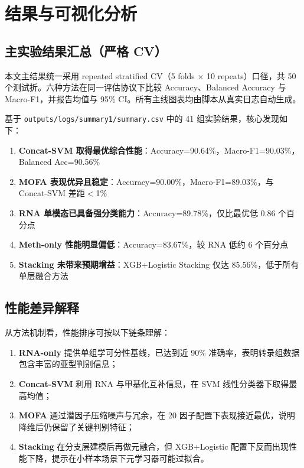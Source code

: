 \section{结果与可视化分析}

\subsection{主实验结果汇总（严格 CV）}

本文主结果统一采用 repeated stratified CV（5 folds $\times$ 10 repeats）口径，共 50 个测试折。六种方法在同一评估协议下比较 Accuracy、Balanced Accuracy 与 Macro-F1，并报告均值与 95\% CI。所有主线图表均由脚本从真实日志自动生成。

基于 \texttt{outputs/logs/summary1/summary.csv} 中的 41 组实验结果，核心发现如下：

\begin{enumerate}
    \item \textbf{Concat-SVM 取得最优综合性能}：Accuracy=90.64\%，Macro-F1=90.03\%，Balanced Acc=90.56\%
    \item \textbf{MOFA 表现优异且稳定}：Accuracy=90.00\%，Macro-F1=89.03\%，与 Concat-SVM 差距$<$1\%
    \item \textbf{RNA 单模态已具备强分类能力}：Accuracy=89.78\%，仅比最优低 0.86 个百分点
    \item \textbf{Meth-only 性能明显偏低}：Accuracy=83.67\%，较 RNA 低约 6 个百分点
    \item \textbf{Stacking 未带来预期增益}：XGB+Logistic Stacking 仅达 85.56\%，低于所有单层融合方法
\end{enumerate}

\subsection{性能差异解释}

从方法机制看，性能排序可按以下链条理解：

\begin{enumerate}
    \item \textbf{RNA-only} 提供单组学可分性基线，已达到近 90\% 准确率，表明转录组数据包含丰富的亚型判别信息；
    \item \textbf{Concat-SVM} 利用 RNA 与甲基化互补信息，在 SVM 线性分类器下取得最高均值；
    \item \textbf{MOFA} 通过潜因子压缩噪声与冗余，在 20 因子配置下表现接近最优，说明降维后仍保留了关键判别特征；
    \item \textbf{Stacking} 在分支层建模后再做元融合，但 XGB+Logistic 配置下反而出现性能下降，提示在小样本场景下元学习器可能过拟合。
\end{enumerate}

